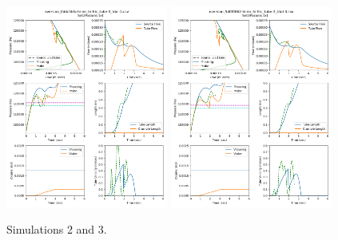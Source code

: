 \documentclass[letterpaper]{article}
\begin{document}
\clearpage
\begin{figure}\centering
\includegraphics[width=0.475\textwidth]{Set2result28-Jul.png}
\includegraphics[width=0.475\textwidth]{Set3result28-Jul.png}
\caption{Simulations 2 and 3.}
\end{figure}
\end{document}
